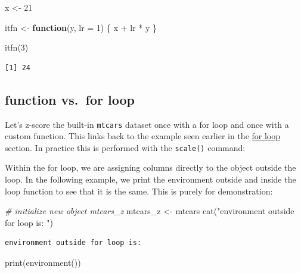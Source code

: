 \documentclass[
]{book}
\newenvironment{Shaded}{\begin{snugshade}}{\end{snugshade}}
\newcommand{\AttributeTok}[1]{\textcolor[rgb]{0.77,0.63,0.00}{#1}}
\newcommand{\CommentTok}[1]{\textcolor[rgb]{0.56,0.35,0.01}{\textit{#1}}}
\newcommand{\ControlFlowTok}[1]{\textcolor[rgb]{0.13,0.29,0.53}{\textbf{#1}}}
\newcommand{\DecValTok}[1]{\textcolor[rgb]{0.00,0.00,0.81}{#1}}
\newcommand{\FunctionTok}[1]{\textcolor[rgb]{0.00,0.00,0.00}{#1}}
\newcommand{\NormalTok}[1]{#1}
\newcommand{\OtherTok}[1]{\textcolor[rgb]{0.56,0.35,0.01}{#1}}
\newcommand{\SpecialCharTok}[1]{\textcolor[rgb]{0.00,0.00,0.00}{#1}}
\newcommand{\StringTok}[1]{\textcolor[rgb]{0.31,0.60,0.02}{#1}}
\begin{document}
\begin{Shaded}
\begin{Highlighting}[]
\NormalTok{x }\OtherTok{\textless{}{-}} \DecValTok{21}

\NormalTok{itfn }\OtherTok{\textless{}{-}} \ControlFlowTok{function}\NormalTok{(y, }\AttributeTok{lr =} \DecValTok{1}\NormalTok{) \{}
\NormalTok{  x }\SpecialCharTok{+}\NormalTok{ lr }\SpecialCharTok{*}\NormalTok{ y}
\NormalTok{\}}

\FunctionTok{itfn}\NormalTok{(}\DecValTok{3}\NormalTok{)}
\end{Highlighting}
\end{Shaded}

\begin{verbatim}
[1] 24
\end{verbatim}

\hypertarget{function-vs.-for-loop}{%
\subsection{function vs.~for loop}\label{function-vs.-for-loop}}

Let's z-score the built-in \texttt{mtcars} dataset once with a for loop and once with a custom function. This links back to the example seen earlier in the \protect\hyperlink{fordata}{for loop} section. In practice this is performed with the \texttt{scale()} command:

Within the for loop, we are assigning columns directly to the object outside the loop. In the following example, we print the environment outside and inside the loop function to see that it is the same. This is purely for demonstration:

\begin{Shaded}
\begin{Highlighting}[]
\CommentTok{\# initialize new object \textquotesingle{}mtcars\_z\textquotesingle{}}
\NormalTok{mtcars\_z }\OtherTok{\textless{}{-}}\NormalTok{ mtcars}
\FunctionTok{cat}\NormalTok{(}\StringTok{"environment outside for loop is: "}\NormalTok{)}
\end{Highlighting}
\end{Shaded}

\begin{verbatim}
environment outside for loop is: 
\end{verbatim}

\begin{Shaded}
\begin{Highlighting}[]
\FunctionTok{print}\NormalTok{(}\FunctionTok{environment}\NormalTok{())}
\end{Highlighting}
\end{Shaded}
\end{document}
